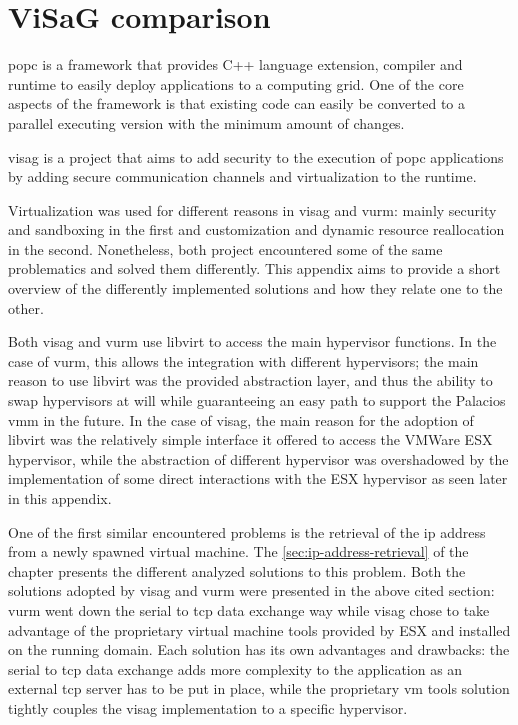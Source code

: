 \chapter{ViSaG comparison}

\gls{popc} \cite{popc} is a framework that provides C++ language extension, compiler and runtime to easily deploy applications to a computing grid. One of the core aspects of the framework is that existing code can easily be converted to a parallel executing version with the minimum amount of changes.

\gls{visag} \cite{visag} is a project that aims to add security to the execution of \gls{popc} applications by adding secure communication channels and virtualization to the runtime.

Virtualization was used for different reasons in \gls{visag} and \gls{vurm}: mainly security and sandboxing in the first and customization and dynamic resource reallocation in the second. Nonetheless, both project encountered some of the same problematics and solved them differently. This appendix aims to provide a short overview of the differently implemented solutions and how they relate one to the other.

Both \gls{visag} and \gls{vurm} use libvirt to access the main hypervisor functions. In the case of \gls{vurm}, this allows the integration with different hypervisors; the main reason to use libvirt was the provided abstraction layer, and thus the ability to swap hypervisors at will while guaranteeing an easy path to support the Palacios \gls{vmm} in the future. In the case of \gls{visag}, the main reason for the adoption of libvirt was the relatively simple interface it offered to access the VMWare ESX hypervisor, while the abstraction of different hypervisor was overshadowed by the implementation of some direct interactions with the ESX hypervisor as seen later in this appendix.

One of the first similar encountered problems is the retrieval of the \gls{ip} address from a newly spawned virtual machine. The \autoref{sec:ip-address-retrieval} of the  chapter presents the different analyzed solutions to this problem. Both the solutions adopted by \gls{visag} and \gls{vurm} were presented in the above cited section: \gls{vurm} went down the serial to \gls{tcp} data exchange way while \gls{visag} chose to take advantage of the proprietary virtual machine tools provided by ESX and installed on the running domain. Each solution has its own advantages and drawbacks: the serial to \gls{tcp} data exchange adds more complexity to the application as an external \gls{tcp} server has to be put in place, while the proprietary \gls{vm} tools solution tightly couples the \gls{visag} implementation to a specific hypervisor.


